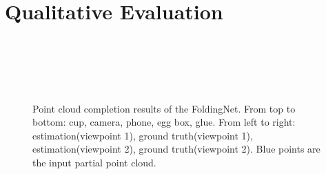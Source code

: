\documentclass[12pt,DIV14,BCOR12mm,a4paper,footinclude=false,headinclude,parskip=half-,twoside,openright,cleardoublepage=empty,toc=index,bibliography=totoc,listof=totoc]{scrreprt}
\numberwithin{equation}{chapter}
\begin{document}
\section{Qualitative Evaluation}
\begin{figure}[H]
	\centering
	\\
  \centering
	\\
  \centering
	\\
  \centering
	\\
  \centering
	\caption{Point cloud completion results of the FoldingNet. From top to bottom: cup, camera, phone, egg box, glue. From left to right: estimation(viewpoint 1), ground truth(viewpoint 1), estimation(viewpoint 2), ground truth(viewpoint 2). Blue points are the input partial point cloud.}
	\label{img:app_comp}
\end{figure}
\end{document}
